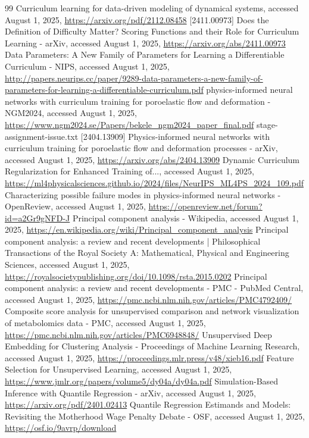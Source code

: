 \newpage
\begin{thebibliography}{99}
     Curriculum learning for data-driven modeling of dynamical systems, accessed August 1, 2025, \url{https://arxiv.org/pdf/2112.08458}
     [2411.00973] Does the Definition of Difficulty Matter? Scoring Functions and their Role for Curriculum Learning - arXiv, accessed August 1, 2025, \url{https://arxiv.org/abs/2411.00973}
     Data Parameters: A New Family of Parameters for Learning a Differentiable Curriculum - NIPS, accessed August 1, 2025, \url{http://papers.neurips.cc/paper/9289-data-parameters-a-new-family-of-parameters-for-learning-a-differentiable-curriculum.pdf}
     physics-informed neural networks with curriculum training for poroelastic flow and deformation - NGM2024, accessed August 1, 2025, \url{https://www.ngm2024.se/Papers/bekele_ngm2024_paper_final.pdf}
     stage-assignment-issue.txt
     [2404.13909] Physics-informed neural networks with curriculum training for poroelastic flow and deformation processes - arXiv, accessed August 1, 2025, \url{https://arxiv.org/abs/2404.13909}
     Dynamic Curriculum Regularization for Enhanced Training of..., accessed August 1, 2025, \url{https://ml4physicalsciences.github.io/2024/files/NeurIPS_ML4PS_2024_109.pdf}
     Characterizing possible failure modes in physics-informed neural networks - OpenReview, accessed August 1, 2025, \url{https://openreview.net/forum?id=a2Gr9gNFD-J}
     Principal component analysis - Wikipedia, accessed August 1, 2025, \url{https://en.wikipedia.org/wiki/Principal_component_analysis}
     Principal component analysis: a review and recent developments | Philosophical Transactions of the Royal Society A: Mathematical, Physical and Engineering Sciences, accessed August 1, 2025, \url{https://royalsocietypublishing.org/doi/10.1098/rsta.2015.0202}
     Principal component analysis: a review and recent developments - PMC - PubMed Central, accessed August 1, 2025, \url{https://pmc.ncbi.nlm.nih.gov/articles/PMC4792409/}
     Composite score analysis for unsupervised comparison and network visualization of metabolomics data - PMC, accessed August 1, 2025, \url{https://pmc.ncbi.nlm.nih.gov/articles/PMC6948848/}
     Unsupervised Deep Embedding for Clustering Analysis - Proceedings of Machine Learning Research, accessed August 1, 2025, \url{https://proceedings.mlr.press/v48/xieb16.pdf}
     Feature Selection for Unsupervised Learning, accessed August 1, 2025, \url{https://www.jmlr.org/papers/volume5/dy04a/dy04a.pdf}
     Simulation-Based Inference with Quantile Regression - arXiv, accessed August 1, 2025, \url{https://arxiv.org/pdf/2401.02413}
     Quantile Regression Estimands and Models: Revisiting the Motherhood Wage Penalty Debate - OSF, accessed August 1, 2025, \url{https://osf.io/9avrp/download}
\end{thebibliography}
